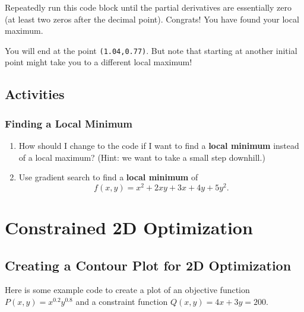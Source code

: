 \documentclass[
]{book}
\providecommand{\tightlist}{%
  \setlength{\itemsep}{0pt}\setlength{\parskip}{0pt}}
\begin{document}
Repeatedly run this code block until the partial derivatives are essentially zero (at least two zeros after the decimal point). Congrats! You have found your local maximum.

You will end at the point \texttt{(1.04,0.77)}. But note that starting at another initial point might take you to a different local maximum!

\hypertarget{activities-19}{%
\section{Activities}\label{activities-19}}

\hypertarget{finding-a-local-minimum}{%
\subsection{Finding a Local Minimum}\label{finding-a-local-minimum}}

\begin{enumerate}
\def\labelenumi{\arabic{enumi}.}
\tightlist
\item
  How should I change to the code if I want to find a \textbf{local minimum} instead of a local maximum? (Hint: we want to take a small step downhill.)
\item
  Use gradient search to find a \textbf{local minimum} of
  \[f(x,y) = x^2 + 2 x y + 3 x + 4 y + 5 y^2.\]
\end{enumerate}

\hypertarget{constrained-2d-optimization}{%
\chapter{Constrained 2D Optimization}\label{constrained-2d-optimization}}

\hypertarget{creating-a-contour-plot-for-2d-optimization}{%
\section{Creating a Contour Plot for 2D Optimization}\label{creating-a-contour-plot-for-2d-optimization}}

Here is some example code to create a plot of an objective function \(P(x,y) = x^{0.2} y^{0.8}\) and a constraint function \(Q(x,y)=4x + 3y=200\).
\end{document}
